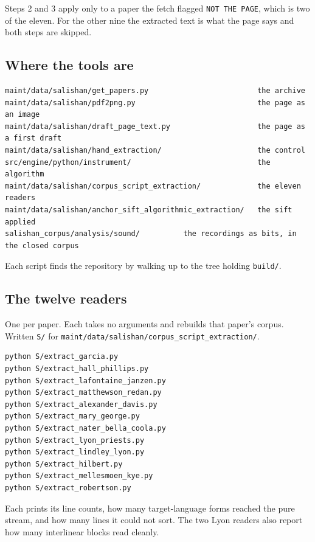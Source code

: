 Steps 2 and 3 apply only to a paper the fetch flagged \texttt{NOT THE PAGE}, which is two of the eleven. For the other nine the extracted text is what the page says and both steps are skipped.

\subsection{Where the tools are}

\begin{lstlisting}[breaklines=true,breakatwhitespace=false,basicstyle=\ttfamily\small]
maint/data/salishan/get_papers.py                         the archive
maint/data/salishan/pdf2png.py                            the page as an image
maint/data/salishan/draft_page_text.py                    the page as a first draft
maint/data/salishan/hand_extraction/                      the control
src/engine/python/instrument/                             the algorithm
maint/data/salishan/corpus_script_extraction/             the eleven readers
maint/data/salishan/anchor_sift_algorithmic_extraction/   the sift applied
salishan_corpus/analysis/sound/          the recordings as bits, in the closed corpus
\end{lstlisting}

Each script finds the repository by walking up to the tree holding \texttt{build/\allowbreak{}}.

\subsection{The twelve readers}

One per paper. Each takes no arguments and rebuilds that paper's corpus. Written \texttt{S/\allowbreak{}} for \texttt{maint/\allowbreak{}data/\allowbreak{}salishan/\allowbreak{}corpus\_\allowbreak{}script\_\allowbreak{}extraction/\allowbreak{}}.

\begin{lstlisting}[breaklines=true,breakatwhitespace=false,basicstyle=\ttfamily\small]
python S/extract_garcia.py
python S/extract_hall_phillips.py
python S/extract_lafontaine_janzen.py
python S/extract_matthewson_redan.py
python S/extract_alexander_davis.py
python S/extract_mary_george.py
python S/extract_nater_bella_coola.py
python S/extract_lyon_priests.py
python S/extract_lindley_lyon.py
python S/extract_hilbert.py
python S/extract_mellesmoen_kye.py
python S/extract_robertson.py
\end{lstlisting}

Each prints its line counts, how many target-language forms reached the pure stream, and how many lines it could not sort. The two Lyon readers also report how many interlinear blocks read cleanly.

